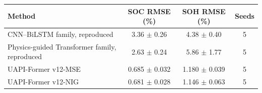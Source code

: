 \begin{tabular}{lccc}
\toprule
Method & SOC RMSE (\%) & SOH RMSE (\%) & Seeds \\
\midrule
CNN--BiLSTM family, reproduced & 3.36 $\pm$ 0.26 & 4.38 $\pm$ 0.40 & 5 \\
Physics-guided Transformer family, reproduced & 2.63 $\pm$ 0.24 & 5.86 $\pm$ 1.77 & 5 \\
UAPI-Former v12-MSE & 0.685 $\pm$ 0.032 & 1.180 $\pm$ 0.039 & 5 \\
UAPI-Former v12-NIG & 0.681 $\pm$ 0.028 & 1.146 $\pm$ 0.063 & 5 \\
\bottomrule
\end{tabular}
